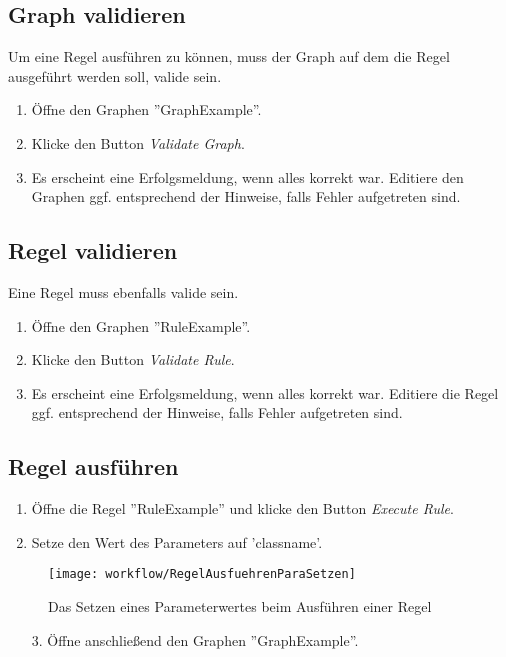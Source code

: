 		\subsection{Graph validieren}	
		Um eine Regel ausführen zu können, muss der Graph auf dem die Regel ausgeführt werden soll, valide sein.
		
		\begin{enumerate}
			\item Öffne den Graphen ''GraphExample''.
			\item Klicke den Button \textit{Validate Graph}.
			\item Es erscheint eine Erfolgsmeldung, wenn alles korrekt war. Editiere den Graphen ggf. entsprechend der Hinweise, falls Fehler aufgetreten sind.
		\end{enumerate}
		
		\subsection{Regel validieren}
		Eine Regel muss ebenfalls valide sein.
		
		\begin{enumerate}
			\item Öffne den Graphen ''RuleExample''.
			\item Klicke den Button \textit{Validate Rule}.
			\item Es erscheint eine Erfolgsmeldung, wenn alles korrekt war. Editiere die Regel ggf. entsprechend der Hinweise, falls Fehler aufgetreten sind.
		\end{enumerate}
	
		\subsection{Regel ausführen}
		\begin{enumerate}
			\item Öffne die Regel ''RuleExample'' und klicke den Button \textit{Execute Rule}.
			\item Setze den Wert des Parameters auf 'classname'.
		\end{enumerate}
			\begin{figure}[h!] %
				\centering
				\texttt{[image: workflow/RegelAusfuehrenParaSetzen]}
				\caption{Das Setzen eines Parameterwertes beim Ausführen einer Regel}
				\label{fig:regelAusfuehrenParaSetzen}
			\end{figure}	

		\begin{enumerate}					
			
			\item[3.] Öffne anschließend den Graphen ''GraphExample''.
		\end{enumerate}
		
